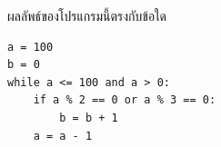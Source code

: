\question ผลลัพธ์ของโปรแกรมนี้ตรงกับข้อใด
\begin{verbatim}
a = 100
b = 0
while a <= 100 and a > 0:
    if a % 2 == 0 or a % 3 == 0:
        b = b + 1
    a = a - 1
\end{verbatim}

